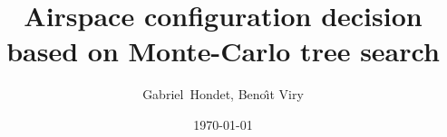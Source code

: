 \documentclass{article}
\title{Airspace configuration decision based on Monte-Carlo tree search}
\author{Gabriel~Hondet, Beno\^{\i}t Viry}
\date{\today}
\begin{document}
\maketitle

\begin{abstract}
  
\end{abstract}



\end{document}
